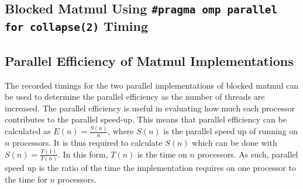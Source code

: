 \documentclass{article}
\begin{document}
\subsection{Blocked Matmul Using \texttt{\#pragma omp parallel for collapse(2)} Timing}
\begin{table}[ht!]
    \caption{Parallel Collapsed Blocked Matrix-Matrix Multiplication Timings (Seconds) on NOTS}
    \centering
\end{table}

\subsection{Parallel Efficiency of Matmul Implementations}
The recorded timings for the two parallel implementations of blocked matmul can be used to determine the parallel efficiency as the number of threads are increased. The parallel efficiency is useful in evaluating how much each processor contributes to the parallel speed-up. This means that parallel efficiency can be calculated as $E(n) = \frac{S(n)}{n}$, where $S(n)$ is the parallel speed up of running on $n$ processors. It is thus required to calculate $S(n)$ which can be done with $S(n) = \frac{T(1)}{T(n)}$. In this form, \(T(n)\) is the time on \( n \) processors. As such, parallel speed up is the ratio of the time the implementation requires on one processor to the time for \( n\) processors.
\end{document}
